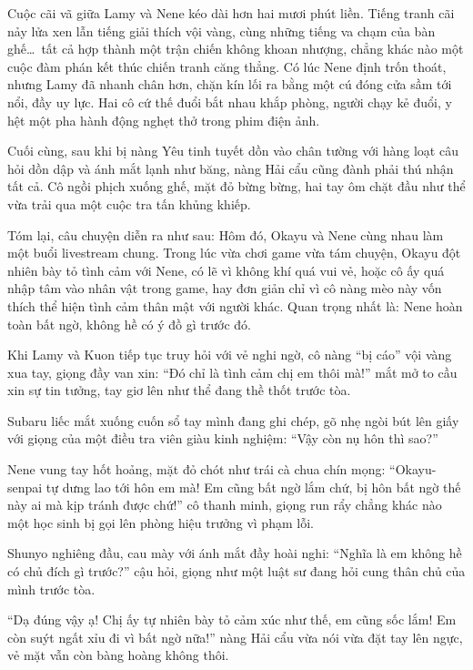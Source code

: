 \documentclass[../main.tex]{subfiles}
\begin{document}
\ct

Cuộc cãi vã giữa Lamy và Nene kéo dài hơn hai mươi phút liền. Tiếng tranh cãi nảy lửa xen lẫn tiếng giải thích vội vàng, cùng những tiếng va chạm của bàn ghế\dots\ tất cả hợp thành một trận chiến không khoan nhượng, chẳng khác nào một cuộc đàm phán kết thúc chiến tranh căng thẳng. Có lúc Nene định trốn thoát, nhưng Lamy đã nhanh chân hơn, chặn kín lối ra bằng một cú đóng cửa sầm tới nổi, đầy uy lực. Hai cô cứ thế đuổi bắt nhau khắp phòng, người chạy kẻ đuổi, y hệt một pha hành động nghẹt thở trong phim điện ảnh.

Cuối cùng, sau khi bị nàng Yêu tinh tuyết dồn vào chân tường với hàng loạt câu hỏi dồn dập và ánh mắt lạnh như băng, nàng Hải cẩu cũng đành phải thú nhận tất cả. Cô ngồi phịch xuống ghế, mặt đỏ bừng bừng, hai tay ôm chặt đầu như thể vừa trải qua một cuộc tra tấn khủng khiếp.

Tóm lại, câu chuyện diễn ra như sau: Hôm đó, Okayu và Nene cùng nhau làm một buổi livestream chung. Trong lúc vừa chơi game vừa tám chuyện, Okayu đột nhiên bày tỏ tình cảm với Nene, có lẽ vì không khí quá vui vẻ, hoặc cô ấy quá nhập tâm vào nhân vật trong game, hay đơn giản chỉ vì cô nàng mèo này vốn thích thể hiện tình cảm thân mật với người khác. Quan trọng nhất là: Nene hoàn toàn bất ngờ, không hề có ý đồ gì trước đó.

Khi Lamy và Kuon tiếp tục truy hỏi với vẻ nghi ngờ, cô nàng ``bị cáo'' vội vàng xua tay, giọng đầy van xin: ``Đó chỉ là tình cảm chị em thôi mà!'' mắt mở to cầu xin sự tin tưởng, tay giơ lên như thể đang thề thốt trước tòa.

Subaru liếc mắt xuống cuốn sổ tay mình đang ghi chép, gõ nhẹ ngòi bút lên giấy với giọng của một điều tra viên giàu kinh nghiệm: ``Vậy còn nụ hôn thì sao?''

Nene vung tay hốt hoảng, mặt đỏ chót như trái cà chua chín mọng: ``Okayu-senpai tự dưng lao tới hôn em mà! Em cũng bất ngờ lắm chứ, bị hôn bất ngờ thế này ai mà kịp tránh được chứ!'' cô thanh minh, giọng run rẩy chẳng khác nào một học sinh bị gọi lên phòng hiệu trưởng vì phạm lỗi.

Shunyo nghiêng đầu, cau mày với ánh mắt đầy hoài nghi: ``Nghĩa là em không hề có chủ đích gì trước?'' cậu hỏi, giọng như một luật sư đang hỏi cung thân chủ của mình trước tòa.

``Dạ đúng vậy ạ! Chị ấy tự nhiên bày tỏ cảm xúc như thế, em cũng sốc lắm! Em còn suýt ngất xỉu đi vì bất ngờ nữa!'' nàng Hải cẩu vừa nói vừa đặt tay lên ngực, vẻ mặt vẫn còn bàng hoàng không thôi.
\end{document}
